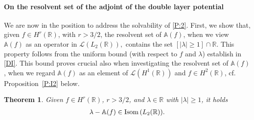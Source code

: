 \documentclass[11pt,reqno]{amsart}
\numberwithin{equation}{section}
\newcommand{\0}{\Omega}
\newcommand{\bA}{\mathbb{A}}
\newcommand{\kL}{\mathcal{L}}
\newcommand{\R}{\mathbb{R}}
\newtheorem{thm}{Theorem}[section]
\numberwithin{equation}{section}
\begin{document}
 \paragraph{\bf On the resolvent set of the adjoint of the double layer potential}
We  are now in the position to address the solvability of \eqref{P:2}.   
First, we  show that, given $f\in H^r(\R)$, with $r>3/2$,    the resolvent set of $ \bA(f)$,  when we view $ \bA(f)$ as an operator in $\kL(L_2(\R)),$ contains the set $[|\lambda|\geq1]\cap\R$. 
This property follows from the uniform bound  (with respect to $f$ and $\lambda$) establish in \eqref{DI}. 
This bound proves crucial also when investigating the resolvent set of $\bA(f)$,  when we regard  $ \bA(f)$ as an element of $\kL(H^1(\R)) $ and $f\in H^2(\R)$, cf. Proposition~\ref{P:I2} below.
\begin{thm}\label{T:I1} 
Given  $f\in H^r(\R)$, $r>3/2$,  and $\lambda\in\R$ with $|\lambda|\geq1$, it holds  
\begin{align*} 
 \lambda-\bA(f)\in{\rm Isom\,}(L_2(\R)).
\end{align*}
\end{thm}
\end{document}
